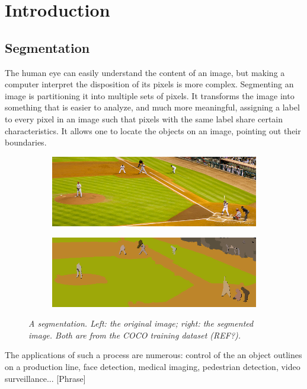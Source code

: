 \documentclass{article}
\begin{document}
\newpage
\section{Introduction}

    \subsection{Segmentation}
            The human eye can easily understand the content of an image, but making a computer interpret the disposition of its pixels is more complex. Segmenting an image is partitioning it into multiple sets of pixels. It transforms the image into something that is easier to analyze, and much more meaningful, assigning a label to every pixel in an image such that pixels with the same label share certain characteristics. It allows one to locate the objects on an image, pointing out their boundaries.
            \begin{figure}[!ht]
            \centering
            \begin{subfigure}{.49\linewidth}
                \centering
                \includegraphics[width=0.9\linewidth]{pics/img_segm1.jpg}
            \end{subfigure}
            \begin{subfigure}{.49\linewidth}
                \centering
                \includegraphics[width=0.9\linewidth]{pics/img_segm2.png}
            \end{subfigure}
                \caption{\textit{A segmentation. Left: the original image; right: the segmented image. Both are from the COCO training dataset (REF?).}}
                \label{fig:segm}
            \end{figure}
            The applications of such a process are numerous: control of the an object outlines on a production line, face detection, medical imaging, pedestrian detection, video surveillance...
            [Phrase]
\end{document}
